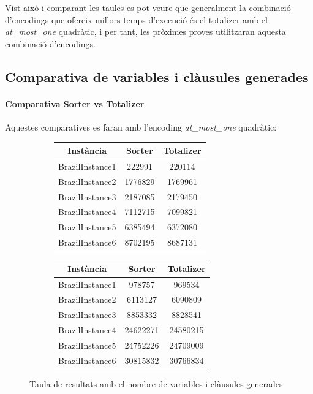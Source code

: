 \documentclass[11pt,a4paper,twoside]{report}
\begin{document}
  Vist això i comparant les taules es pot veure que generalment la combinació d'encodings que ofereix millors temps d'execució és el totalizer amb el \textit{at\_most\_one} quadràtic, i per tant, les pròximes proves utilitzaran aquesta combinació d'encodings.

  \subsection{Comparativa de variables i clàusules generades}

  \paragraph*{Comparativa Sorter vs Totalizer}

  Aquestes comparatives es faran amb l'encoding \textit{at\_most\_one} quadràtic:

  \begin{figure}[ht!]
    \centering
    \begin{subfigure}[b]{0.45\linewidth}
      \begin{tabular} { c | c c }
        Instància & Sorter & Totalizer \\
        \hline
        BrazilInstance1 & 222991 &  220114 \\
        BrazilInstance2 & 1776829 & 1769961  \\
        BrazilInstance3 & 2187085 & 2179450 \\
        BrazilInstance4 & 7112715 & 7099821 \\
        BrazilInstance5 & 6385494 & 6372080 \\
        BrazilInstance6 & 8702195 & 8687131 \\
      \end{tabular}
    \end{subfigure}
    \begin{subfigure}[b]{0.45\linewidth}
      \begin{tabular} { c | c c }
        Instància & Sorter & Totalizer \\
        \hline
        BrazilInstance1 & 978757 &    969534 \\
        BrazilInstance2 &  6113127 & 	6090809\\
        BrazilInstance3 &  8853332	& 8828541 \\
        BrazilInstance4 & 24622271	& 24580215 \\
        BrazilInstance5 & 24752226	& 24709009 \\
        BrazilInstance6 & 30815832	& 30766834 \\
      \end{tabular}
    \end{subfigure}
    \caption{Taula de resultats amb el nombre de variables i clàusules generades}
    \label{fig:taula5}
  \end{figure}
\end{document}
